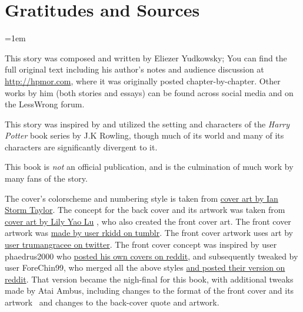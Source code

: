 \pagebreak
\chapter{Gratitudes and Sources}

{
    \parindent=0pt
    \parskip=1em

    \ifnum{} %
        \makeatletter
            \let\@href\href
            \renewcommand{\href}[2]{\@href{#1}{\textcolor{linkblue}{#2}}}
        \makeatother
    \fi


    This story was composed and written by Eliezer Yudkowsky; You can find the full original text including
    his author's notes and audience discussion at \url{http://hpmor.com}, where it was originally posted
    chapter-by-chapter. Other works by him (both stories and essays) can be found across social media and
    on the LessWrong forum.

    This story was inspired by and utilized the setting and characters of the \emph{Harry Potter} book series by
    J.K Rowling, though much of its world and many of its characters are significantly divergent to it.

    This book is \emph{not} an official publication, and is the culmination of much work by many fans of the
    story.

    The cover's colorscheme and numbering style is taken from \href{https://github.com/ianstormtaylor/hpmor}{%
    cover art by Ian Storm Taylor}. The concept for the back cover \ifnum{}\else and its artwork\fi%
    was taken from \href{https://github.com/knuesel/hpmor\#covers}{cover art by Lily Yao Lu}\ifnum{} ,%
    who also created the front cover art\fi. \ifnum{} The front cover artwork was %
    \href{https://rkidd.tumblr.com/post/58419865638}{made by user rkidd on tumblr}. \fi%
    \ifnum{} The front cover artwork uses art by %
    \href{https://twitter.com/trumangracee/status/940917751769579521}{user trumangracee on twitter}. \fi%
    The front cover concept was inspired by user phaedrus2000 who \href{https://www.reddit.com/r/HPMOR/comments/70sug6/yet_another_set_of_printed_books/dn6e1ew/}{%
    posted his own covers on reddit}, and subsequently tweaked by user ForeChin99, who
    merged all the above styles \href{https://www.reddit.com/r/HPMOR/comments/hvlhkm/trying_to_make_my_own_book_covers_am_i_winning/}{ %
    and posted their version on reddit}. That version became the nigh-final for this book, with additional tweaks
    made by Atai Ambus, including changes to the format of the front cover\ifnum{} and its artwork \fi
    \ifnum{}\ and changes to the back-cover quote\ifnum{} and artwork\fi\fi.

}
